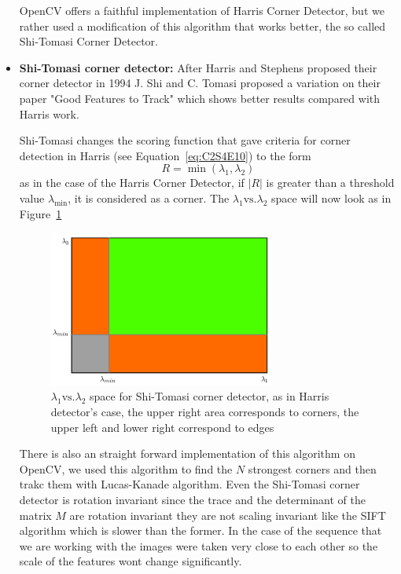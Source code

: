 \begin{itemize}
OpenCV offers a faithful implementation of Harris Corner Detector, but we rather used a modification of this algorithm that works better, the so called Shi-Tomasi Corner Detector.

\item \textbf{Shi-Tomasi corner detector:} After Harris and Stephens proposed their corner detector in 1994 J. Shi and C. Tomasi proposed a variation on their paper "Good Features to Track" \cite{ShiTomasi} which shows better results compared with Harris work. 

\bigskip

Shi-Tomasi changes the scoring function that gave criteria for corner detection in Harris (see Equation~\ref{eq:C2S4E10}) to the form
\begin{equation}
\label{eq:C2S4E11}
R = \min (\lambda_1,\lambda_2)
\end{equation}
as in the case of the Harris Corner Detector, if $|R|$ is greater than a threshold value $\lambda_{\min}$, it is considered as a corner. The $\lambda_1\text{vs.}\lambda_2$ space will now look as in Figure~\ref{fig:shitomasi_space}

\begin{figure}[h!]
\centering
\includegraphics[width=0.7\textwidth]{./Diagrams/shitomasi_space.png}
\caption{$\lambda_1\text{vs.}\lambda_2$ space for Shi-Tomasi corner detector, as in Harris detector's case, the upper right area corresponds to corners, the upper left and lower right correspond to edges}
\label{fig:shitomasi_space}
\end{figure}

There is also an straight forward implementation of this algorithm on OpenCV, we used this algorithm to find the $N$ strongest corners and then trakc them with Lucas-Kanade algorithm. Even the Shi-Tomasi corner detector is rotation invariant since the trace and the determinant of the matrix $M$ are rotation invariant they are not scaling invariant like the SIFT algorithm which is slower than the former. In the case of the sequence that we are working with the images were taken very close to each other so the scale of the features wont change significantly. 
\end{itemize}

